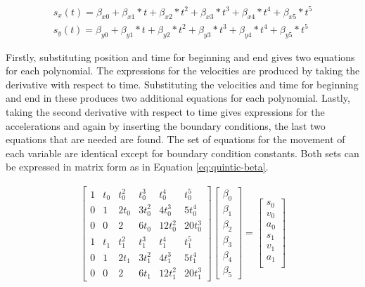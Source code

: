 \begin{align}
    s_x(t) = \beta_{x0} + \beta_{x1}*t + \beta_{x2}*t^2 + \beta_{x3}*t^3 + \beta_{x4}*t^4 + \beta_{x5}*t^5 \label{eq:cp1}\\
    s_y(t) = \beta_{y0} + \beta_{y1}*t + \beta_{y2}*t^2 + \beta_{y3}*t^3 + \beta_{y4}*t^4 + \beta_{y5}*t^5 \label{eq:cp2}
\end{align}

Firstly, substituting position and time for beginning and end gives two equations for each polynomial. The expressions for the velocities are produced by taking the derivative with respect to time. Substituting the velocities and time for beginning and end in these produces two additional equations for each polynomial. Lastly, taking the second derivative with respect to time gives expressions for the accelerations and again by inserting the boundary conditions, the last two equations that are needed are found. The set of equations for the movement of each variable are identical except for boundary condition constants. Both sets can be expressed in matrix form as in Equation \ref{eq:quintic-beta}.

\begin{align}
    \begin{bmatrix}
        1  & t_0  & t_0^2    & t_0^3    & t_0^4    & t_0^5 \\
        0  & 1   & 2t_0    & 3t_0^2  & 4t_0^3  & 5t_0^4 \\
        0  & 0   & 2       & 6t_0    & 12t_0^2 & 20t_0^3 \\
        1  & t_1  & t_1^2    & t_1^3    & t_1^4    & t_1^5 \\
        0  & 1   & 2t_1    & 3t_1^2  & 4t_1^3  & 5t_1^4 \\
        0  & 0   & 2       & 6t_1    & 12t_1^2 & 20t_1^3
    \end{bmatrix}
    \begin{bmatrix}
        \beta_{0} \\
        \beta_{1} \\
        \beta_{2} \\
        \beta_{3} \\
        \beta_{4} \\
        \beta_{5}
    \end{bmatrix}
    =
    \begin{bmatrix}
        s_{0} \\
        v_{0} \\
        a_{0} \\
        s_{1} \\
        v_{1} \\
        a_{1} \\        
    \end{bmatrix}
    \label{eq:quintic-beta}
\end{align}


